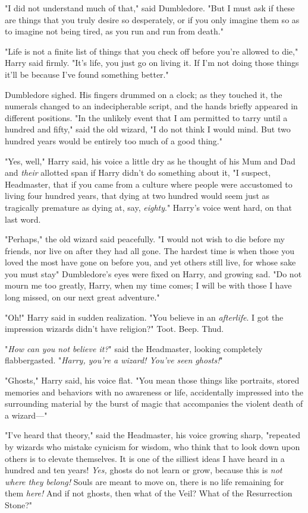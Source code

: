 "I did not understand much of that," said Dumbledore. "But I must ask if these
are things that you truly desire so desperately, or if you only imagine them so
as to imagine not being tired, as you run and run from death."

"Life is not a finite list of things that you check off before you're allowed
to die," Harry said firmly. "It's life, you just go on living it. If I'm not
doing those things it'll be because I've found something better."

Dumbledore sighed. His fingers drummed on a clock; as they touched it, the
numerals changed to an indecipherable script, and the hands briefly appeared in
different positions. "In the unlikely event that I am permitted to tarry until
a hundred and fifty," said the old wizard, "I do not think I would mind. But
two hundred years would be entirely too much of a good thing."

"Yes, well," Harry said, his voice a little dry as he thought of his Mum and
Dad and \emph{their} allotted span if Harry didn't do something about it, "I
suspect, Headmaster, that if you came from a culture where people were
accustomed to living four hundred years, that dying at two hundred would seem
just as tragically premature as dying at, say, \emph{eighty}." Harry's voice
went hard, on that last word.

"Perhaps," the old wizard said peacefully. "I would not wish to die before my
friends, nor live on after they had all gone. The hardest time is when those
you loved the most have gone on before you, and yet others still live, for
whose sake you must stay{\el}" Dumbledore's eyes were fixed on Harry, and
growing sad. "Do not mourn me too greatly, Harry, when my time comes; I will be
with those I have long missed, on our next great adventure."

"Oh!" Harry said in sudden realization. "You believe in an \emph{afterlife}. I
got the impression wizards didn't have religion?"
\sbreak
Toot. Beep. Thud.

"\emph{How can you not believe it?}" said the Headmaster, looking completely
flabbergasted. "\emph{Harry, you're a wizard! You've seen ghosts!}"

"Ghosts," Harry said, his voice flat. "You mean those things like portraits,
stored memories and behaviors with no awareness or life, accidentally impressed
into the surrounding material by the burst of magic that accompanies the
violent death of a wizard\mbox{---}"

"I've heard that theory," said the Headmaster, his voice growing sharp,
"repeated by wizards who mistake cynicism for wisdom, who think that to look
down upon others is to elevate themselves. It is one of the silliest ideas I
have heard in a hundred and ten years! \emph{Yes,} ghosts do not learn or grow,
because this is \emph{not where they belong!} Souls are meant to move on, there
is no life remaining for them \emph{here!} And if not ghosts, then what of the
Veil? What of the Resurrection Stone?"

